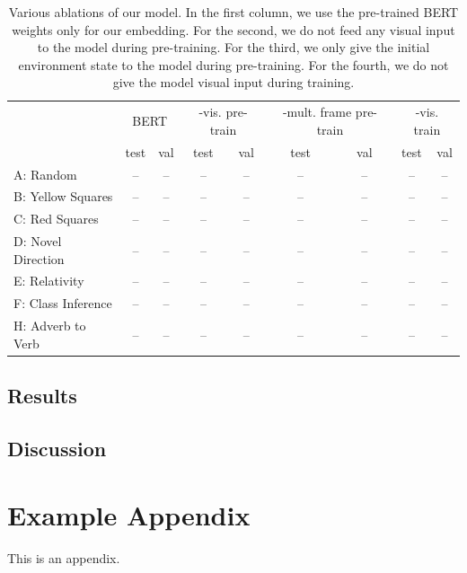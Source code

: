 \documentclass[11pt]{article}
\begin{document}
\begin{table}
	\begin{center}
		\begin{tabularx}{\textwidth}{ l|cccccccc}
			\toprule
			\multicolumn{1}{c}{} 
			& \multicolumn{2}{c|}{BERT}  
			& \multicolumn{2}{c|}{-vis. pre-train}  
			& \multicolumn{2}{c|}{-mult. frame pre-train}  
			& \multicolumn{2}{c|}{-vis. train} \\
			& test  & val  & test &  val & test &  val & test & val \\
			\midrule
			A: Random & --  & --  & -- &  -- & -- &  -- & -- &  -- \\
			B: Yellow Squares & --  & --  & -- &  -- & -- &  -- & -- &  -- \\
			C: Red Squares & --  & --  & -- &  -- & -- &  -- & -- &  -- \\
			D: Novel Direction & --  & --  & -- & -- & -- &  -- & -- &  --  \\
			E: Relativity & --  & --  & -- & -- & -- &  -- & -- &  --  \\
			F: Class Inference & --  & --  & -- &  -- &-- &  -- & -- &  --  \\
			H: Adverb to Verb & --  & --  & -- &  -- &-- &  -- & -- &  -- \\
			\bottomrule
		\end{tabularx}
	\end{center}
	\caption{Various ablations of our model. In the first column, we use the pre-trained BERT weights only for our embedding. For the second, we do not feed any visual input to the model during pre-training. For the third, we only give the initial environment state to the model during pre-training. For the fourth, we do not give the model visual input during training.}
	\label{tab:ablations}
\end{table}


\subsection{Results}

\subsection{Discussion}






\appendix

\section{Example Appendix}
\label{sec:appendix}

This is an appendix.
\end{document}
